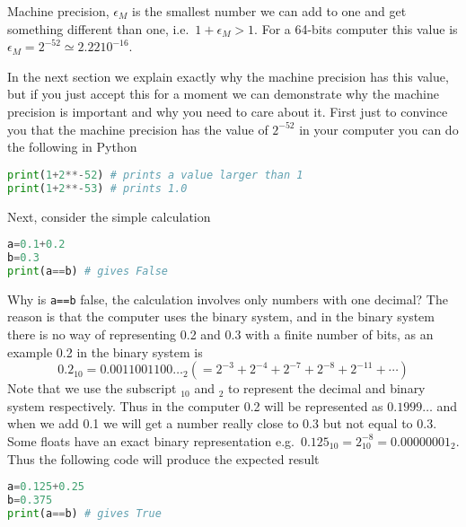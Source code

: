 \documentclass[graybox,sectrefs,envcountresetchap,open=right,final]{svmonodo}
\newenvironment{graybox2admon}[1][]{
\begin{graybox2mdframed}[frametitle=#1]
}
{
\end{graybox2mdframed}
}
\begin{document}
\begin{graybox2admon}[Machine Precision]
Machine precision, $\epsilon_M$ is the smallest number we can add to one and get something different than one, i.e.~$1+\epsilon_M>1$. For a 64-bits computer this value is $\epsilon_M=2^{-52}\simeq2.2210^{-16}$.
\end{graybox2admon}



In the next section we explain exactly why the machine precision has this value, but if you just accept this for a moment we can demonstrate why the machine precision is important and why you need to care about it. First just to convince you that the machine precision has the value of $2^{-52}$ in your computer you can do the following in Python



\begin{lstlisting}[language=python,style=blue1bar]
print(1+2**-52) # prints a value larger than 1
print(1+2**-53) # prints 1.0

\end{lstlisting}

Next, consider the simple calculation




\begin{lstlisting}[language=python,style=blue1bar]
a=0.1+0.2
b=0.3
print(a==b) # gives False

\end{lstlisting}

Why is \texttt{a==b} false, the calculation involves only numbers with one decimal? The reason is that the computer uses the binary system, and in the binary system there is no way of representing 0.2 and 0.3 with a finite number of bits, as an example 0.2 in the binary system is
\begin{equation}
0.2_{10}=0.0011001100\ldots_2 (=2^{-3}+2^{-4}+2^{-7}+2^{-8}+2^{-11}+\cdots)
\label{eq:taylor:02}
\end{equation}
Note that we use the subscript $_{10}$ and $_2$ to represent the decimal and binary system respectively.
Thus in the computer 0.2 will be represented as $0.1999\ldots$ and when we add 0.1 we will get a number really close to 0.3 but not equal to 0.3. Some floats have an exact binary representation e.g.~$0.125_{10}=2^{-8}_{10}=0.00000001_2$. Thus the following code will produce the expected result




\begin{lstlisting}[language=python,style=blue1bar]
a=0.125+0.25
b=0.375
print(a==b) # gives True

\end{lstlisting}
\end{document}

